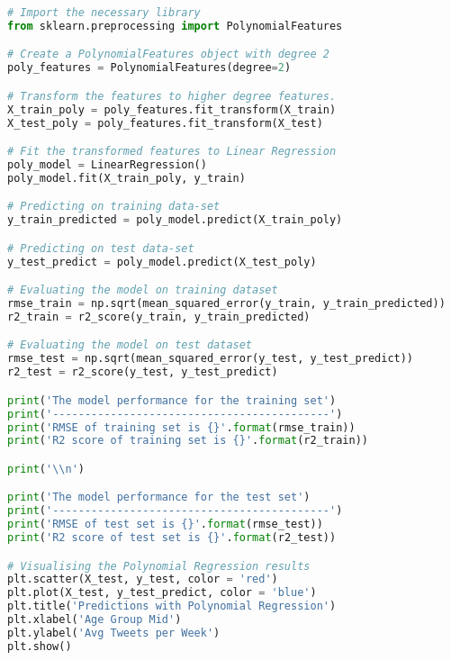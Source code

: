 \documentclass{article}
\begin{document}
\begin{lstlisting}[language=Python]
# Import the necessary library
from sklearn.preprocessing import PolynomialFeatures

# Create a PolynomialFeatures object with degree 2
poly_features = PolynomialFeatures(degree=2)

# Transform the features to higher degree features.
X_train_poly = poly_features.fit_transform(X_train)
X_test_poly = poly_features.fit_transform(X_test)

# Fit the transformed features to Linear Regression
poly_model = LinearRegression()
poly_model.fit(X_train_poly, y_train)

# Predicting on training data-set
y_train_predicted = poly_model.predict(X_train_poly)

# Predicting on test data-set
y_test_predict = poly_model.predict(X_test_poly)

# Evaluating the model on training dataset
rmse_train = np.sqrt(mean_squared_error(y_train, y_train_predicted))
r2_train = r2_score(y_train, y_train_predicted)

# Evaluating the model on test dataset
rmse_test = np.sqrt(mean_squared_error(y_test, y_test_predict))
r2_test = r2_score(y_test, y_test_predict)

print('The model performance for the training set')
print('-------------------------------------------')
print('RMSE of training set is {}'.format(rmse_train))
print('R2 score of training set is {}'.format(r2_train))

print('\\n')

print('The model performance for the test set')
print('-------------------------------------------')
print('RMSE of test set is {}'.format(rmse_test))
print('R2 score of test set is {}'.format(r2_test))

# Visualising the Polynomial Regression results
plt.scatter(X_test, y_test, color = 'red')
plt.plot(X_test, y_test_predict, color = 'blue')
plt.title('Predictions with Polynomial Regression')
plt.xlabel('Age Group Mid')
plt.ylabel('Avg Tweets per Week')
plt.show()
\end{lstlisting}
\end{document}
